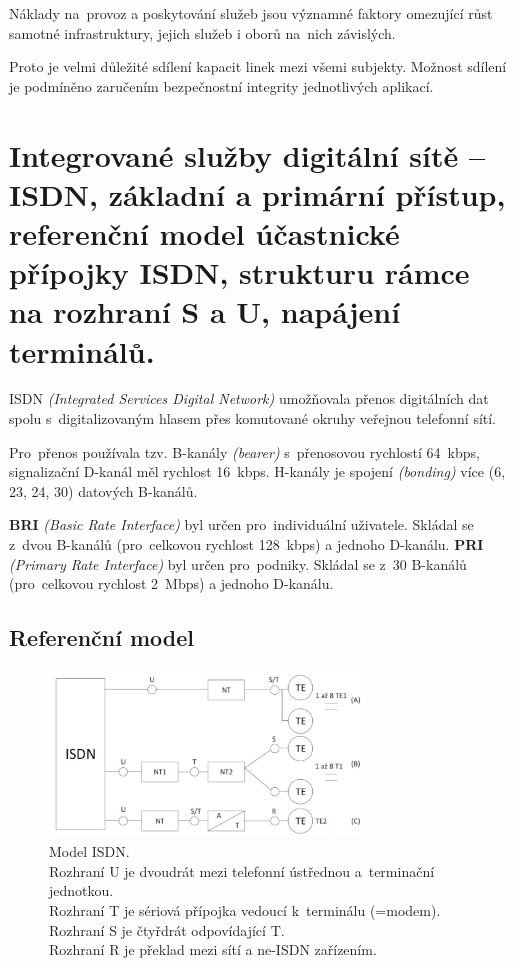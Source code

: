 Náklady na~provoz a poskytování služeb jsou významné faktory omezující růst samotné infrastruktury, jejich služeb i oborů na~nich závislých.

Proto je velmi důležité sdílení kapacit linek mezi všemi subjekty.
Možnost sdílení je podmíněno zaručením bezpečnostní integrity jednotlivých aplikací.


\clearpage
\section{Integrované služby digitální sítě -- ISDN, základní a primární přístup, referenční model účastnické přípojky ISDN, strukturu rámce na rozhraní S a U, napájení terminálů.}

ISDN \emph{(Integrated Services Digital Network)} umožňovala přenos digitálních dat spolu s~digitalizovaným hlasem přes komutované okruhy veřejnou telefonní sítí.

Pro~přenos používala tzv. B-kanály \emph{(bearer)} s~přenosovou rychlostí 64~kbps, signalizační D-kanál měl rychlost 16~kbps.
H-kanály je spojení \emph{(bonding)} více (6, 23, 24, 30) datových B-kanálů.

\textbf{BRI} \emph{(Basic Rate Interface)} byl určen pro~individuální uživatele.
Skládal se z~dvou B-kanálů (pro~celkovou rychlost 128~kbps) a jednoho D-kanálu.
\textbf{PRI} \emph{(Primary Rate Interface)} byl určen pro~podniky.
Skládal se z~30 B-kanálů (pro~celkovou rychlost 2~Mbps) a jednoho D-kanálu.

\subsection{Referenční model}

\begin{figure}[ht]
    \centering
    \includegraphics[width=0.75\textwidth]{snimky/ISDN-ref.png}
    \caption{
        Model ISDN.
        \\Rozhraní U je dvoudrát mezi telefonní ústřednou a~terminační jednotkou.
        \\Rozhraní T je sériová přípojka vedoucí k~terminálu (=modem).
        \\Rozhraní S je čtyřdrát odpovídající T.
        \\Rozhraní R je překlad mezi sítí a ne-ISDN zařízením.
    }
\end{figure}
\FloatBarrier


